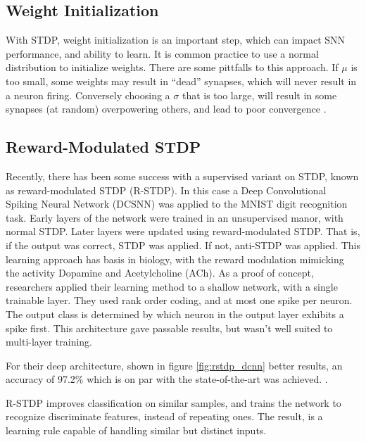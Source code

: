     \subsection{Weight Initialization}
    
    With STDP, weight initialization is an important step, which can impact SNN
    performance, and ability to learn. It is common practice to use a normal
    distribution to initialize weights. There are some pittfalls to this
    approach. If $\mu$ is too small, some weights may result in ``dead''
    synapses, which will never result in a neuron firing. Conversely choosing a
    $\sigma$ that is too large, will result in some synapses (at random)
    overpowering others, and lead to poor convergence \cite{vigneron_2020}.


    \subsection{Reward-Modulated STDP}
    
    Recently, there has been some success with a supervised variant on STDP,
    known as reward-modulated STDP (R-STDP). In this case a Deep Convolutional
    Spiking Neural Network (DCSNN) was applied to the MNIST digit recognition
    task. Early layers of the network were trained in an unsupervised manor,
    with normal STDP. Later layers were updated using reward-modulated
    STDP. That is, if the output was correct, STDP was applied. If not,
    anti-STDP was applied. This learning approach has basis in biology, with the
    reward modulation mimicking the activity Dopamine and Acetylcholine
    (ACh). As a proof of concept, researchers applied their learning method to a
    shallow network, with a single trainable layer. They used rank order coding,
    and at most one spike per neuron. The output class is determined by which
    neuron in the output layer exhibits a spike first. This architecture gave
    passable results, but wasn't well suited to multi-layer training.
    
    For their deep architecture, shown in figure \ref{fig:rstdp_dcnn} better
    results, an accuracy of 97.2\% which is on par with the state-of-the-art was
    achieved. \cite{mozafari_2018}.
    

    R-STDP improves classification on similar samples, and trains the network to
    recognize discriminate features, instead of repeating ones. The result, is
    a learning rule capable of handling similar but distinct inputs.

